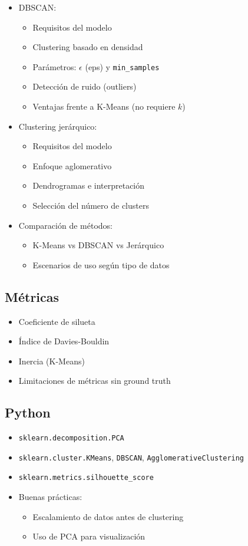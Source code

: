 \documentclass[12pt,a4paper,openany,oneside]{book}
\begin{document}
\begin{itemize}
\begin{itemize}
    \item DBSCAN:
    \begin{itemize}
        \item Requisitos del modelo
        \item Clustering basado en densidad
        \item Parámetros: $\epsilon$ (eps) y \texttt{min\_samples}
        \item Detección de ruido (outliers)
        \item Ventajas frente a K-Means (no requiere $k$)
    \end{itemize}

    \item Clustering jerárquico:
    \begin{itemize}
        \item Requisitos del modelo
        \item Enfoque aglomerativo
        \item Dendrogramas e interpretación
        \item Selección del número de clusters
    \end{itemize}

    \item Comparación de métodos:
    \begin{itemize}
        \item K-Means vs DBSCAN vs Jerárquico
        \item Escenarios de uso según tipo de datos
    \end{itemize}
\end{itemize}

\subsection{Métricas}
\begin{itemize}
    \item Coeficiente de silueta
    \item Índice de Davies-Bouldin
    \item Inercia (K-Means)
    \item Limitaciones de métricas sin ground truth
\end{itemize}

\subsection{Python}
\begin{itemize}
    \item \texttt{sklearn.decomposition.PCA}
    \item \texttt{sklearn.cluster.KMeans}, \texttt{DBSCAN}, \texttt{AgglomerativeClustering}
    \item \texttt{sklearn.metrics.silhouette\_score}
    \item Buenas prácticas:
    \begin{itemize}
        \item Escalamiento de datos antes de clustering
        \item Uso de PCA para visualización
    \end{itemize}
\end{itemize}


\end{itemize}
\end{document}
